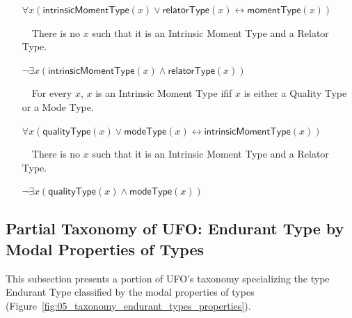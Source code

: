 \documentclass{article}
\newcommand{\AxLabel}{a}
\newcounter{cntax}
\newcommand{\myax}[1]{\refstepcounter{cntax}{\bf \small \AxLabel\thecntax}\label{#1}$\,\,\,\,$}
\newcommand{\me}[1]{\textsf{#1}}
\begin{document}
\begin{itemize}
    $\forall x(\textsf{intrinsicMomentType}(x)\vee \textsf{relatorType}(x)\leftrightarrow \textsf{momentType}(x))$
    
    
    
    \item[\myax{ax_momentType_partition}] There is no $x$ such that it is an \me{Intrinsic Moment Type} and a \me{Relator Type}.
    
    $\neg \exists x(\textsf{intrinsicMomentType}(x)\wedge \textsf{relatorType}(x))$
    
    

    \item[\myax{ax_intrinsicMomentType_taxonomy}] For every $x$, $x$ is an \me{Intrinsic Moment Type} ifif $x$ is either a \me{Quality Type} or a \me{Mode Type}.
    
    $\forall x(\textsf{qualityType}(x)\vee \textsf{modeType}(x)\leftrightarrow \textsf{intrinsicMomentType}(x))$
    
    
    
    \item[\myax{ax_intrinsicMomentType_partition}] There is no $x$ such that it is an \me{Intrinsic Moment Type} and a \me{Relator Type}.
    
    $\neg \exists x(\textsf{qualityType}(x)\wedge \textsf{modeType}(x))$
    
    
\end{itemize}



\subsection{Partial Taxonomy of UFO: \me{Endurant Type} by Modal Properties of Types}

This subsection presents a portion of UFO's taxonomy specializing the type \me{Endurant Type} classified by the modal properties of types (Figure~\ref{fig:05_taxonomy_endurant_types_properties}).
\end{document}
